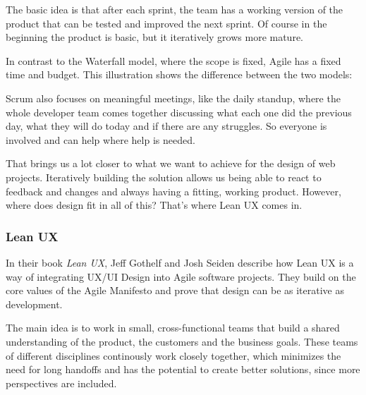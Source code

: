 The basic idea is that after each sprint, the team has a working version of the product that can be
tested and improved the next sprint. Of course in the beginning the product is basic, but it
iteratively grows more mature. 

In contrast to the Waterfall model, where the scope is fixed, Agile has a fixed time and budget.
This illustration shows the difference between the two models:

Scrum also focuses on meaningful meetings, like the daily standup, where the whole developer team
comes together discussing what each one did the previous day, what they will do today and if there
are any struggles. So everyone is involved and can help where help is needed. 


That brings us a lot closer to what we want to achieve for the design of web projects. Iteratively
building the solution allows us being able to react to feedback and changes and always having a
fitting, working product. However, where does design fit in all of this? That's where Lean UX comes
in.

\subsubsection{Lean UX}

In their book \textit{Lean UX}, Jeff Gothelf and Josh Seiden describe how Lean UX is a way of
integrating UX/UI Design into Agile software projects. They build on the core values of the Agile
Manifesto and prove that design can be as iterative as development.  

The main idea is to work in small, cross-functional teams that build a shared understanding of the
product, the customers and the business goals. These teams of different disciplines continously work
closely together, which minimizes the need for long handoffs and has the potential to create better
solutions, since more perspectives are included. 

